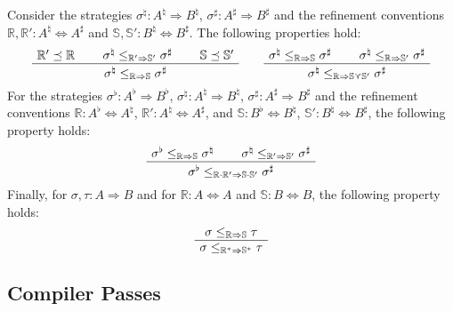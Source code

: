 \documentclass[sigplan,10pt,review,anonymous]{acmart}
\begin{document}
\begin{lemma} \label{lemma:kleenesim} %
Consider the strategies
$\sigma^\natural : A^\natural \Rightarrow B^\natural$,
$\sigma^\sharp : A^\sharp \Rightarrow B^\sharp$ and
the refinement conventions
$\mathbb{R}, \mathbb{R}' : A^\natural \Leftrightarrow A^\sharp$ and
$\mathbb{S}, \mathbb{S}' : B^\natural \Leftrightarrow B^\sharp$.
The following properties hold:
\[
  \AxiomC{$\mathbb{R}' \preceq \mathbb{R}$}
  \AxiomC{$\sigma^\natural \le_{\mathbb{R}' \Rightarrow \mathbb{S}'} \sigma^\sharp$}
  \AxiomC{$\mathbb{S} \preceq \mathbb{S}'$}
  \TrinaryInfC{$\sigma^\natural \le_{\mathbb{R} \Rightarrow \mathbb{S}} \sigma^\sharp$}
  \DisplayProof
  \qquad
  \AxiomC{$\sigma^\natural \le_{\mathbb{R} \Rightarrow \mathbb{S}} \sigma^\sharp$}
  \AxiomC{$\sigma^\natural \le_{\mathbb{R} \Rightarrow \mathbb{S}'} \sigma^\sharp$}
  \BinaryInfC{$\sigma^\natural
     \le_{\mathbb{R} \Rightarrow \mathbb{S} \curlyvee \mathbb{S}'} \sigma^\sharp$}
  \DisplayProof
\]
For the strategies
$\sigma^\flat : A^\flat \Rightarrow B^\flat$,
$\sigma^\natural : A^\natural \Rightarrow B^\natural$,
$\sigma^\sharp : A^\sharp \Rightarrow B^\sharp$ and
the refinement conventions
$\mathbb{R} : A^\flat \Leftrightarrow A^\natural$,
$\mathbb{R}' : A^\natural \Leftrightarrow A^\sharp$, and
$\mathbb{S} : B^\flat \Leftrightarrow B^\natural$,
$\mathbb{S}' : B^\natural \Leftrightarrow B^\sharp$,
the following property holds:
\[
  \AxiomC{$\sigma^\flat \le_{\mathbb{R} \Rightarrow \mathbb{S}} \sigma^\natural$}
  \AxiomC{$\sigma^\natural \le_{\mathbb{R}' \Rightarrow \mathbb{S}'} \sigma^\sharp$}
  \BinaryInfC{$\sigma^\flat
    \le_{\mathbb{R} \cdot \mathbb{R}' \Rightarrow \mathbb{S} \cdot \mathbb{S}'}
    \sigma^\sharp$}
  \DisplayProof
\]
Finally,
for
$\sigma, \tau : A \Rightarrow B$
and for
$\mathbb{R} : A \Leftrightarrow A$ and
$\mathbb{S} : B \Leftrightarrow B$,
the following property holds:
\[
  \AxiomC{$\sigma \le_{\mathbb{R} \Rightarrow \mathbb{S}} \tau$}
  \UnaryInfC{$\sigma \le_{\mathbb{R}^* \Rightarrow \mathbb{S}^*} \tau$}
  \DisplayProof
\]
\end{lemma}


\subsection{Compiler Passes} %
\end{document}
